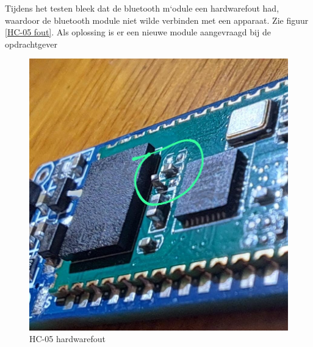 Tijdens het testen bleek dat de bluetooth m`odule een hardwarefout had, waardoor de bluetooth module niet wilde verbinden met een apparaat. Zie figuur \eqref{HC-05 fout}. Als oplossing is er een nieuwe module aangevraagd bij de opdrachtgever
\begin{figure}[h]
    \centering
    \includegraphics[scale = 0.2]{Media/Figuren/bluetooth hardwarefout.jpg}
    \caption{HC-05 hardwarefout}
    \label{HC-05 fout}
\end{figure}


